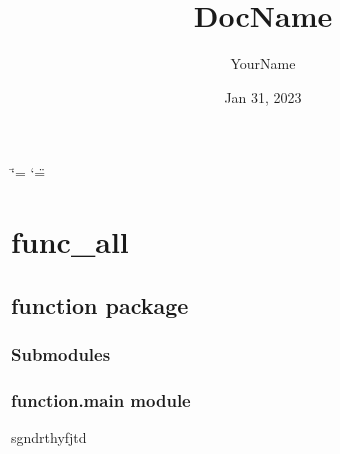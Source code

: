 \documentclass[letterpaper,10pt,english]{sphinxmanual}
\title{DocName}
\date{Jan 31, 2023}
\author{YourName}
\begin{document}
\ifdefined\shorthandoff
  \ifnum\catcode`\=\string=\active\shorthandoff{=}\fi
  \ifnum\catcode`\"=\active{}\fi
\fi

\pagestyle{empty}
\sphinxmaketitle
\pagestyle{plain}
\sphinxtableofcontents
\pagestyle{normal}
\label{\detokenize{index::doc}}


\sphinxstepscope


\chapter{func\_all}
\label{\detokenize{modules:func-all}}\label{\detokenize{modules::doc}}
\sphinxstepscope


\section{function package}
\label{\detokenize{function:function-package}}\label{\detokenize{function::doc}}

\subsection{Submodules}
\label{\detokenize{function:submodules}}

\subsection{function.main module}
\label{\detokenize{function:module-function.main}}\label{\detokenize{function:function-main-module}}
\sphinxAtStartPar
sgndrthyfjtd

\begin{fulllineitems}
\label{\detokenize{function:function.main.mary}}
\pysigstartsignatures
{}
\pysigstopsignatures\begin{description}
\begin{quote}\begin{description}
\end{description}\end{quote}

\end{description}

\end{fulllineitems}
\end{document}
